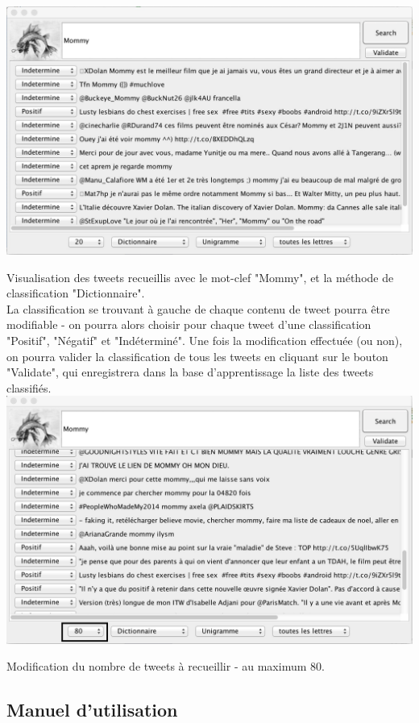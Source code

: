 \documentclass[pdftex,12pt,a4paper]{report}
\begin{document}
\begin{spacing}{1.2}
\includegraphics[scale=0.26]{img/BehAnTweet_Dict_20.jpeg}

Visualisation des tweets recueillis avec le mot-clef "Mommy", et la méthode de classification "Dictionnaire".
\\
La classification se trouvant à gauche de chaque contenu de tweet pourra être modifiable - on pourra alors choisir pour chaque tweet d'une classification "Positif", "Négatif" et "Indéterminé". Une fois la modification effectuée (ou non), on pourra valider la classification de tous les tweets en cliquant sur le bouton "Validate", qui enregistrera dans la base d'apprentissage la liste des tweets classifiés.
\\

\includegraphics[scale=0.52]{img/BehAnTweet_Dict_80_annotation.jpeg}

Modification du nombre de tweets à recueillir - au maximum 80.

\subsection{Manuel d'utilisation}


\end{spacing}
\end{document}
